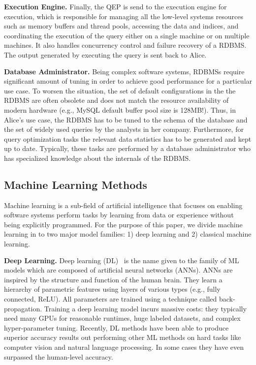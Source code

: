 \vspace{2mm}
\noindent \textbf{Execution Engine.} Finally, the QEP is send to the execution engine for execution, which is responsible for managing all the low-level systems resources such as memory buffers and thread pools, accessing the data and indices, and coordinating the execution of the query either on a single machine or on multiple machines.
It also handles concurrency control and failure recovery of a RDBMS.
The output generated by executing the query is sent back to Alice.

\vspace{2mm}
\noindent \textbf{Database Administrator.} Being complex software systems, RDBMSs require significant amount of tuning in order to achieve good performance for a particular use case.
To worsen the situation, the set of default configurations in the the RDBMS are often obsolete and does not match the resource availability of modern hardware (e.g., MySQL default buffer pool size is 128MB!).
Thus, in Alice's use case, the RDBMS has to be tuned to the schema of the database and the set of widely used queries by the analysts in her company.
Furthermore, for query optimization tasks the relevant data statistics has to be generated and kept up to date.
Typically, these tasks are performed by a database administrator who has specialized knowledge about the internals of the RDBMS.


\subsection{Machine Learning Methods}
Machine learning is a sub-field of artificial intelligence that focuses on enabling software systems perform tasks by learning from data or experience without being explicitly programmed.
For the purpose of this paper, we divide machine learning in to two major model families: 1) deep learning and 2) classical machine learning.

\vspace{2mm}
\noindent \textbf{Deep Learning. } Deep learning (DL)~\cite{dlbook} is the name given to the family of ML models which are composed of artificial neural networks (ANNs).
ANNs are inspired by the structure and function of the human brain.
They learn a hierarchy of parametric features using layers of various types (e.g., fully connected, ReLU).
All parameters are trained using a technique called back-propagation.
Training a deep learning model incurs massive costs: they typically need many GPUs for reasonable runtimes, huge labeled datasets, and complex hyper-parameter tuning.
Recently, DL methods have been able to produce superior accuracy results out performing other ML methods on hard tasks like computer vision and natural language processing.
In some cases they have even surpassed the human-level accuracy.

